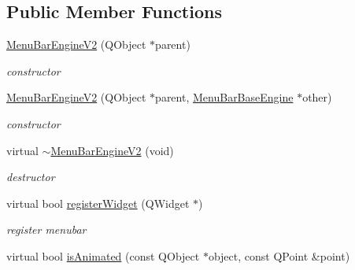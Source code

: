 \subsection*{Public Member Functions}
\begin{DoxyCompactItemize}
\item 
\mbox{\label{class_menu_bar_engine_v2_a07c80d07960f7fe8880934e7b395b43e}} 
\hyperlink{class_menu_bar_engine_v2_a07c80d07960f7fe8880934e7b395b43e}{Menu\+Bar\+Engine\+V2} (Q\+Object $\ast$parent)
\begin{DoxyCompactList}\small\item\em constructor \end{DoxyCompactList}\item 
\mbox{\label{class_menu_bar_engine_v2_a00fa56b5cab8207fcabdca3d2a47d437}} 
\hyperlink{class_menu_bar_engine_v2_a00fa56b5cab8207fcabdca3d2a47d437}{Menu\+Bar\+Engine\+V2} (Q\+Object $\ast$parent, \hyperlink{class_menu_bar_base_engine}{Menu\+Bar\+Base\+Engine} $\ast$other)
\begin{DoxyCompactList}\small\item\em constructor \end{DoxyCompactList}\item 
\mbox{\label{class_menu_bar_engine_v2_a967df91f9d96ae923cdbd58511a7b04b}} 
virtual \hyperlink{class_menu_bar_engine_v2_a967df91f9d96ae923cdbd58511a7b04b}{$\sim$\+Menu\+Bar\+Engine\+V2} (void)
\begin{DoxyCompactList}\small\item\em destructor \end{DoxyCompactList}\item 
\mbox{\label{class_menu_bar_engine_v2_a68c79d78712e1f6f6124adb1b3a661ca}} 
virtual bool \hyperlink{class_menu_bar_engine_v2_a68c79d78712e1f6f6124adb1b3a661ca}{register\+Widget} (Q\+Widget $\ast$)
\begin{DoxyCompactList}\small\item\em register menubar \end{DoxyCompactList}\item 
\mbox{\label{class_menu_bar_engine_v2_a244dfe654f975f1b94b983d373605900}} 
virtual bool \hyperlink{class_menu_bar_engine_v2_a244dfe654f975f1b94b983d373605900}{is\+Animated} (const Q\+Object $\ast$object, const Q\+Point \&point)

\end{DoxyCompactItemize}
